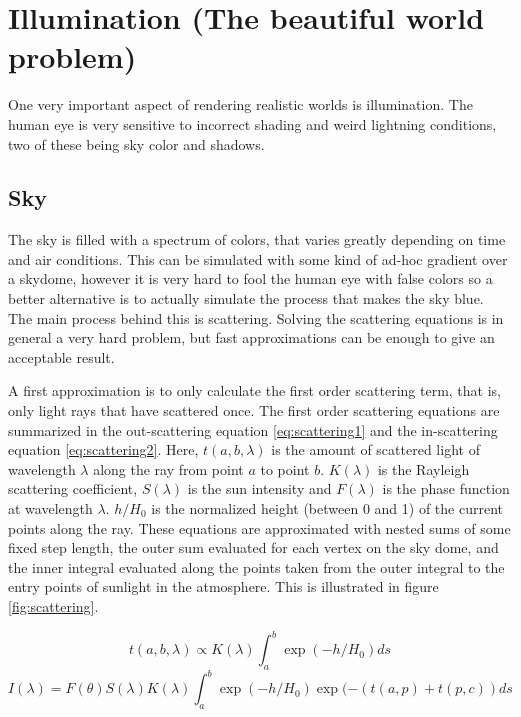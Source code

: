 \documentclass{article}
\begin{document}
\section{Illumination (The beautiful world problem)} \label{sec:illumination}
One very important aspect of rendering realistic worlds is illumination.
The human eye is very sensitive to incorrect shading and weird lightning conditions, two of these being sky color and shadows.

\subsection{Sky}
The sky is filled with a spectrum of colors, that varies greatly depending on time and air conditions.
This can be simulated with some kind of ad-hoc gradient over a skydome, however it is very hard to fool the human eye with false colors so a better alternative is to actually simulate the process that makes the sky blue. 
The main process behind this is scattering. Solving the scattering equations is in general a very hard problem, but fast approximations can be enough to give an acceptable result.

A first approximation is to only calculate the first order scattering term, that is, only light rays that have scattered once.
The first order scattering equations are summarized in the out-scattering equation \ref{eq:scattering1} and the in-scattering equation \ref{eq:scattering2}.\cite{nvidia}
Here, $t(a,b,\lambda)$ is the amount of scattered light of wavelength $\lambda$ along the ray from point $a$ to point $b$. $K(\lambda)$ is the Rayleigh scattering coefficient, $S(\lambda)$ is the sun intensity and $F(\lambda)$ is the phase function at wavelength $\lambda$. $h/H_0$ is the normalized height (between 0 and 1) of the current points along the ray. These equations are approximated with nested sums of some fixed step length, the outer sum evaluated for each vertex on the sky dome, and the inner integral evaluated along the points taken from the outer integral to the entry points of sunlight in the atmosphere. This is illustrated in figure \ref{fig:scattering}.

\begin{equation}\label{eq:scattering1}
    t(a,b,\lambda) \propto K(\lambda) \int_a^b \exp(-h/H_0) ds
\end{equation}
\begin{equation}\label{eq:scattering2}
    I(\lambda) = F(\theta) S(\lambda) K(\lambda) \int_a^b \exp(-h/H_0) \exp(-(t(a,p)+t(p,c)) ds
\end{equation}
\end{document}
